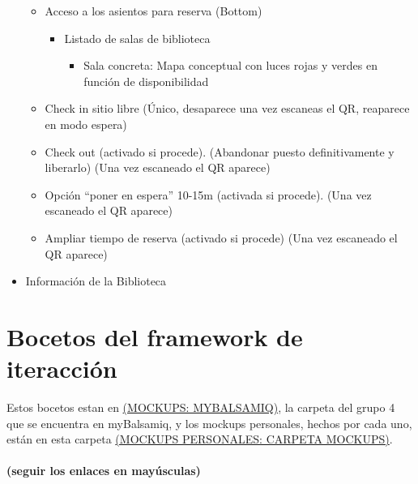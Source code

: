 \documentclass[12pt]{article}
\begin{document}
\begin{itemize}
\begin{itemize}
\begin{itemize}
\begin{itemize}
\end{itemize}

\end{itemize}

\item Acceso a los asientos para reserva (Bottom)

\begin{itemize}
\item Listado de salas de biblioteca
\begin{itemize}
\item Sala concreta: Mapa conceptual con luces rojas y verdes en función de disponibilidad

\end{itemize}
\end{itemize}

\item Check in sitio libre (Único, desaparece una vez escaneas el QR, reaparece en modo espera)

\item Check out (activado si procede). (Abandonar puesto definitivamente y liberarlo) (Una vez escaneado el QR aparece)
\item Opción “poner en espera” 10-15m (activada si procede). (Una vez escaneado el QR aparece)

\item Ampliar tiempo de reserva (activado si procede) (Una vez escaneado el QR aparece)


\end{itemize}

\item Información de la Biblioteca


\end{itemize}





\newpage
\section{Bocetos del framework de iteracción}

Estos bocetos estan en \href{https://ucm-dsi.mybalsamiq.com/projects/1819-b-proyecto-g04/grid}{(MOCKUPS: MYBALSAMIQ)}, la carpeta del grupo 4 que se encuentra en myBalsamiq, y los mockups personales, hechos por cada uno, están en esta carpeta \href{https://drive.google.com/open?id=147zao3EmZsQRw81fojuigk7AfHRFlDBY}{(MOCKUPS PERSONALES: CARPETA MOCKUPS)}.
\\ \- \\
\textbf{(seguir los enlaces en mayúsculas)} \\
\end{document}
